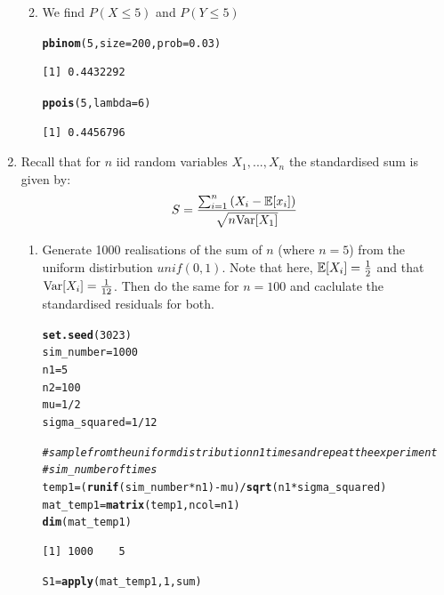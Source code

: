 \documentclass[12pt, a4paper]{article}\usepackage[]{graphicx}\usepackage[]{color}
\makeatletter
\newcommand{\hlnum}[1]{\textcolor[rgb]{0.686,0.059,0.569}{#1}}%
\newcommand{\hlcom}[1]{\textcolor[rgb]{0.678,0.584,0.686}{\textit{#1}}}%
\newcommand{\hlopt}[1]{\textcolor[rgb]{0,0,0}{#1}}%
\newcommand{\hlstd}[1]{\textcolor[rgb]{0.345,0.345,0.345}{#1}}%
\newcommand{\hlkwb}[1]{\textcolor[rgb]{0.69,0.353,0.396}{#1}}%
\newcommand{\hlkwc}[1]{\textcolor[rgb]{0.333,0.667,0.333}{#1}}%
\newcommand{\hlkwd}[1]{\textcolor[rgb]{0.737,0.353,0.396}{\textbf{#1}}}%
\newenvironment{kframe}{%
 \def\at@end@of@kframe{}%
 \ifinner\ifhmode%
  \def\at@end@of@kframe{\end{minipage}}%
  \begin{minipage}{\columnwidth}%
 \fi\fi%
 \def\FrameCommand##1{\hskip\@totalleftmargin \hskip-\fboxsep
 \colorbox{shadecolor}{##1}\hskip-\fboxsep
     \hskip-\linewidth \hskip-\@totalleftmargin \hskip\columnwidth}%
 \MakeFramed {\advance\hsize-\width
   \@totalleftmargin\z@ \linewidth\hsize
   \@setminipage}}%
 {\par\unskip\endMakeFramed%
 \at@end@of@kframe}
\newenvironment{knitrout}{}{} %
\makeatother
\begin{document}
\begin{enumerate}
\begin{enumerate}
\begin{knitrout}
\end{knitrout}
  \item We find $P(X \le 5)$ and $P(Y \le 5)$ 
\begin{knitrout}\small
{}\color{fgcolor}\begin{kframe}
\begin{alltt}
  \hlkwd{pbinom}\hlstd{(}\hlnum{5}\hlstd{,} \hlkwc{size} \hlstd{=} \hlnum{200}\hlstd{,} \hlkwc{prob} \hlstd{=} \hlnum{0.03}\hlstd{)}
\end{alltt}
\begin{verbatim}
[1] 0.4432292
\end{verbatim}
\begin{alltt}
  \hlkwd{ppois}\hlstd{(}\hlnum{5}\hlstd{,} \hlkwc{lambda} \hlstd{=} \hlnum{6}\hlstd{)}
\end{alltt}
\begin{verbatim}
[1] 0.4456796
\end{verbatim}
\end{kframe}
\end{knitrout}
  \end{enumerate}
  \item Recall that for $n$ iid random variables $X_1, ..., X_n$ the standardised sum is given by:
  $$S = \dfrac{\sum_{i = 1}^n\left(X_i - \operatorname{\mathbb{E}}[x_i]\right)}{\sqrt{n\mathrm{Var}[X_1]}}$$
  \begin{enumerate}
    \item Generate 1000 realisations of the sum of $n$ (where $n = 5$) from the uniform distirbution $unif(0, 1)$. Note that here, $\operatorname{\mathbb{E}}[X_i] = \frac{1}{2}$ and that $\mathrm{Var}[X_i] = \frac{1}{12}$. Then do the same for $n = 100$ and caclulate the standardised residuals for both. 
    
    
\begin{knitrout}\small
{}\color{fgcolor}\begin{kframe}
\begin{alltt}
\hlkwd{set.seed}\hlstd{(}\hlnum{3023}\hlstd{)}
\hlstd{sim_number} \hlkwb{=} \hlnum{1000}
\hlstd{n1} \hlkwb{=} \hlnum{5}
\hlstd{n2} \hlkwb{=} \hlnum{100}
\hlstd{mu} \hlkwb{=} \hlnum{1}\hlopt{/}\hlnum{2}
\hlstd{sigma_squared} \hlkwb{=} \hlnum{1}\hlopt{/}\hlnum{12}

\hlcom{# sample from the uniform distribution n1 times and repeat the experiment }
\hlcom{# sim_number of times}
\hlstd{temp1} \hlkwb{=} \hlstd{(}\hlkwd{runif}\hlstd{(sim_number} \hlopt{*} \hlstd{n1)} \hlopt{-} \hlstd{mu)}\hlopt{/}\hlkwd{sqrt}\hlstd{(n1} \hlopt{*} \hlstd{sigma_squared)}
\hlstd{mat_temp1} \hlkwb{=} \hlkwd{matrix}\hlstd{(temp1,} \hlkwc{ncol} \hlstd{= n1)}
\hlkwd{dim}\hlstd{(mat_temp1)}
\end{alltt}
\begin{verbatim}
[1] 1000    5
\end{verbatim}
\begin{alltt}
\hlstd{S1} \hlkwb{=} \hlkwd{apply}\hlstd{(mat_temp1,} \hlnum{1}\hlstd{, sum)}


\end{alltt}
\end{kframe}
\end{knitrout}
\end{enumerate}
\end{enumerate}
\end{document}

